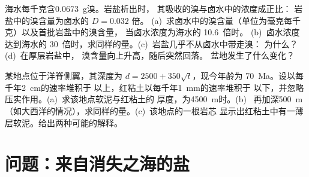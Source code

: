 \begin{exercise}[$\star\star\star$]\label{exo:b1:chemical-biogenic-sediments:11}
海水每千克含\qty{0.0673}{g}溴。岩盐析出时，
其吸收的溴与卤水中的浓度成正比：
岩盐中的溴含量为卤水的 $D = 0.032$ 倍。
(a)~求卤水中的溴含量（单位为毫克每千克）以及首批岩盐中的溴含量，
当卤水浓度为海水的 10.6~倍时。
(b)~卤水浓度达到海水的 30~倍时，求同样的量。(c)~岩盐几乎不从卤水中带走溴：
为什么？(d)~在厚层岩盐中，
溴含量向上升高，随后突然回落。
盆地发生了什么变化？
\end{exercise}

\begin{exercise}[$\star\star\star$]\label{exo:b1:chemical-biogenic-sediments:12}
某地点位于洋脊侧翼，其深度为 $d = 2500 + 350\sqrt t$，现今年龄为
\qty{70}{Ma}。设以每千年\qty{2}{cm}的速率堆积于
以上，红粘土以每千年\qty{1}{mm}的速率堆积于
以下，并忽略压实作用。(a)~求该地点软泥与红粘土的
厚度，为\qty{4500}{m}时。(b)~
再加深\qty{500}{m}（如大西洋的情况），求同样的量。(c)~该地点的一根岩芯
显示出红粘土中有一薄层软泥。给出两种可能的解释。
\end{exercise}

\section{问题：来自消失之海的盐}

